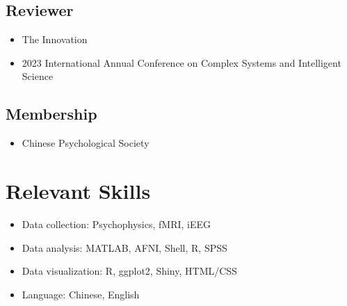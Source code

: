 \documentclass[11pt,a4paper,]{awesome-cv}
\providecommand{\tightlist}{%
	\setlength{\itemsep}{0pt}\setlength{\parskip}{0pt}}
\begin{document}
\vspace{1.5mm}

\subsection{Reviewer}\label{reviewer}

\begin{itemize}
\tightlist
\item
  The Innovation
\item
  2023 International Annual Conference on Complex Systems and
  Intelligent Science
\end{itemize}

\subsection{Membership}\label{membership}

\begin{itemize}
\tightlist
\item
  Chinese Psychological Society
\end{itemize}

\section{Relevant Skills}\label{relevant-skills}

\vspace{1.5mm}

\begin{itemize}
\tightlist
\item
  Data collection:\hspace{0.5em} Psychophysics,\hspace{0.3em}
  fMRI,\hspace{0.3em} iEEG
\item
  Data analysis:\hspace{0.5em} MATLAB,\hspace{0.3em} AFNI,\hspace{0.3em}
  Shell,\hspace{0.3em} R,\hspace{0.3em} SPSS
\item
  Data visualization:\hspace{0.5em} R,\hspace{0.3em}
  ggplot2,\hspace{0.3em} Shiny,\hspace{0.3em} HTML/CSS
\item
  Language:\hspace{0.5em} Chinese,\hspace{0.3em} English
\end{itemize}
\end{document}

